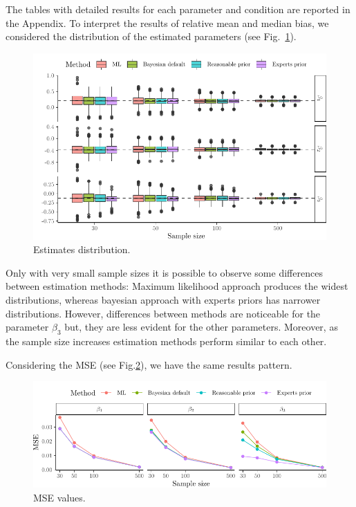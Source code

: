 \documentclass[graybox]{svmult}
\begin{document}
The tables with detailed results for each parameter and condition are reported in the Appendix. To interpret the results of relative mean and median bias, we considered the distribution of the estimated parameters (see Fig.~\ref{fig:boxplots}). 
\begin{figure}[b]
	\sidecaption
	\includegraphics[width = 1\textwidth]{figure/Plot_boxplots}
	\caption{Estimates distribution.}
	\label{fig:boxplots}
\end{figure}
Only with very small sample sizes it is possible to observe some differences between estimation methods: Maximum likelihood approach produces the widest distributions, whereas bayesian approach with experts priors has narrower distributions. However, differences between methods are noticeable for the parameter $\beta_3$ but, they are less evident for the other parameters. Moreover, as the sample size increases estimation methods perform similar to each other.

Considering the MSE (see Fig.\ref{fig:mse}), we have the same results pattern. 

\begin{figure}[t]
	\sidecaption
	\includegraphics[width = 1\textwidth]{figure/Plot_MSE}
	\caption{MSE values.}
	\label{fig:mse}
\end{figure}
\end{document}
